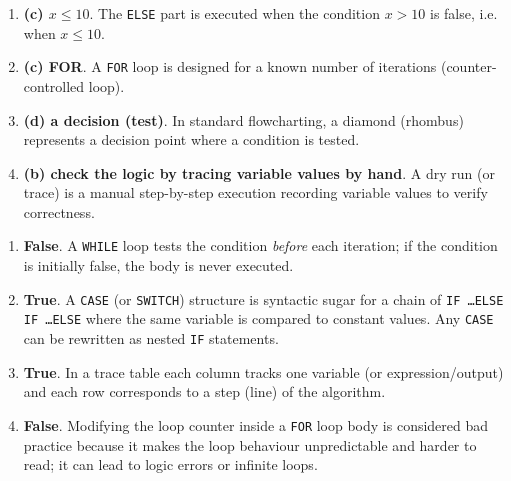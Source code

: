 \documentclass[11pt]{article}
\begin{document}
\begin{corrige}
\begin{enumerate}
\item \textbf{(c) $x \leq 10$}. The \texttt{ELSE} part is executed when the condition $x > 10$ is false, i.e. when $x \leq 10$.
\item \textbf{(c) FOR}. A \texttt{FOR} loop is designed for a known number of iterations (counter-controlled loop).
\item \textbf{(d) a decision (test)}. In standard flowcharting, a diamond (rhombus) represents a decision point where a condition is tested.
\item \textbf{(b) check the logic by tracing variable values by hand}. A dry run (or trace) is a manual step-by-step execution recording variable values to verify correctness.
\end{enumerate}
\end{corrige}

\begin{corrige}
\begin{enumerate}
\item \textbf{False}. A \texttt{WHILE} loop tests the condition \emph{before} each iteration; if the condition is initially false, the body is never executed.
\item \textbf{True}. A \texttt{CASE} (or \texttt{SWITCH}) structure is syntactic sugar for a chain of \texttt{IF \ldots ELSE IF \ldots ELSE} where the same variable is compared to constant values. Any \texttt{CASE} can be rewritten as nested \texttt{IF} statements.
\item \textbf{True}. In a trace table each column tracks one variable (or expression/output) and each row corresponds to a step (line) of the algorithm.
\item \textbf{False}. Modifying the loop counter inside a \texttt{FOR} loop body is considered bad practice because it makes the loop behaviour unpredictable and harder to read; it can lead to logic errors or infinite loops.
\end{enumerate}
\end{corrige}
\end{document}
